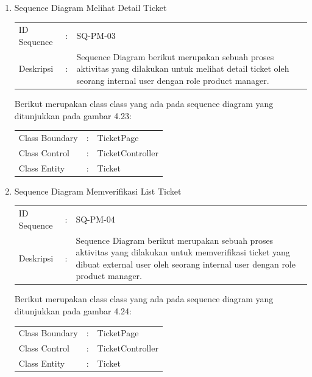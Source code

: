 \documentclass[12pt]{article}
\begin{document}
\begin{enumerate}[label=\textbf{4.\arabic*.}]
\begin{enumerate} [label=\textbf{4.2.\arabic*.}, wide, labelwidth=!, labelindent=0pt]
\begin{enumerate}[label=\textbf{4.2.2.\arabic*.}, wide, labelwidth=!, labelindent=0pt]
\begin{enumerate}[label=\arabic*.]
\begin{tabularx}{.9\linewidth}{@{} l l X @{}}
                \end{tabularx}

                
                \item Sequence Diagram Melihat Detail Ticket
                
                \begin{tabularx}{.9\linewidth}{@{} l l X @{}}
                    ID Sequence &	: & SQ-PM-03 \\
                    Deskripsi &	: & Sequence Diagram berikut merupakan sebuah proses aktivitas yang dilakukan untuk melihat detail ticket oleh seorang internal user dengan role product manager. 
        
                \end{tabularx}

                \noindent Berikut merupakan class class yang ada pada sequence diagram yang ditunjukkan pada gambar 4.23:

                \begin{tabularx}{.9\linewidth}{@{} l l X @{}}
                    Class Boundary & : & TicketPage \\
                    Class Control & : & TicketController \\
                    Class Entity & : & Ticket
                
                \end{tabularx}
                
                \item Sequence Diagram Memverifikasi List Ticket
                
                \begin{tabularx}{.9\linewidth}{@{} l l X @{}}
                    ID Sequence &	: & SQ-PM-04 \\
                    Deskripsi &	: & Sequence Diagram berikut merupakan sebuah proses aktivitas yang dilakukan untuk memverifikasi ticket yang dibuat external user oleh seorang internal user dengan role product manager. 
        
                \end{tabularx}

                \noindent Berikut merupakan class class yang ada pada sequence diagram yang ditunjukkan pada gambar 4.24:

                \begin{tabularx}{.9\linewidth}{@{} l l X @{}}
                    Class Boundary & : & TicketPage \\
                    Class Control & : & TicketController \\
                    Class Entity & : & Ticket
                

\end{tabularx}
\end{enumerate}
\end{enumerate}
\end{enumerate}
\end{enumerate}
\end{document}
